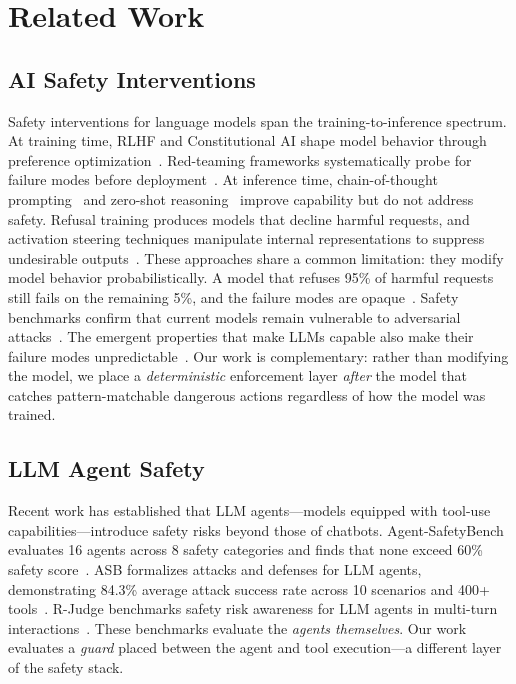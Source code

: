 \documentclass[journal]{IEEEtran}
\begin{document}
\section{Related Work}
\label{sec:related}

\subsection{AI Safety Interventions}

Safety interventions for language models span the training-to-inference spectrum. At training time, RLHF and Constitutional AI shape model behavior through preference optimization~\cite{bai2022constitutional}. Red-teaming frameworks systematically probe for failure modes before deployment~\cite{ganguli2022red}. At inference time, chain-of-thought prompting~\cite{wei2022chain} and zero-shot reasoning~\cite{kojima2022zero} improve capability but do not address safety. Refusal training produces models that decline harmful requests, and activation steering techniques manipulate internal representations to suppress undesirable outputs~\cite{arditi2024refusal,turner2023activation,rimsky2024steering}. These approaches share a common limitation: they modify model behavior probabilistically. A model that refuses 95\% of harmful requests still fails on the remaining 5\%, and the failure modes are opaque~\cite{bender2021dangers}. Safety benchmarks confirm that current models remain vulnerable to adversarial attacks~\cite{li2024wmdp,mazeika2024harmbench}. The emergent properties that make LLMs capable also make their failure modes unpredictable~\cite{schaeffer2024emergent}. Our work is complementary: rather than modifying the model, we place a \emph{deterministic} enforcement layer \emph{after} the model that catches pattern-matchable dangerous actions regardless of how the model was trained.

\subsection{LLM Agent Safety}

Recent work has established that LLM agents---models equipped with tool-use capabilities---introduce safety risks beyond those of chatbots. Agent-SafetyBench evaluates 16 agents across 8 safety categories and finds that none exceed 60\% safety score~\cite{agentSafetyBench2024}. ASB formalizes attacks and defenses for LLM agents, demonstrating 84.3\% average attack success rate across 10 scenarios and 400+ tools~\cite{han2024asb}. R-Judge benchmarks safety risk awareness for LLM agents in multi-turn interactions~\cite{yuan2024rjudge}. These benchmarks evaluate the \emph{agents themselves}. Our work evaluates a \emph{guard} placed between the agent and tool execution---a different layer of the safety stack.
\end{document}
